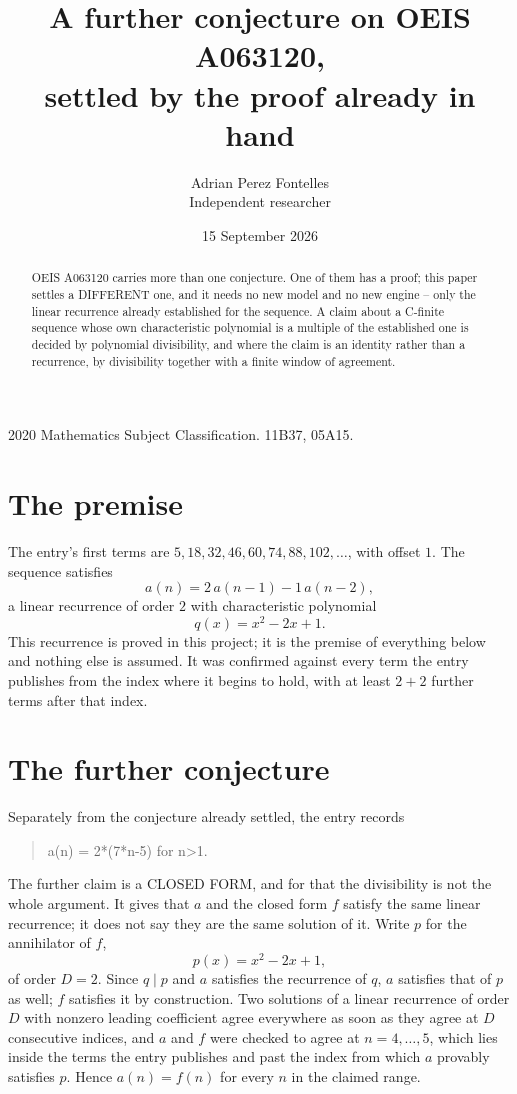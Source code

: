 \documentclass[11pt,a4paper]{article}
\title{A further conjecture on OEIS A063120,\\ \large settled by the proof already in hand}
\author{Adrian Perez Fontelles\\ \small Independent researcher}
\date{15 September 2026}
\theoremstyle{plain}
\theoremstyle{definition}
\begin{document}
\maketitle

\begin{abstract}
OEIS A063120 carries more than one conjecture. One of them has a proof; this paper settles a
DIFFERENT one, and it needs no new model and no new engine -- only the linear recurrence already
established for the sequence. A claim about a C-finite sequence whose own characteristic
polynomial is a multiple of the established one is decided by polynomial divisibility, and where
the claim is an identity rather than a recurrence, by divisibility together with a finite window
of agreement.
\end{abstract}

\noindent\small 2020 Mathematics Subject Classification. 11B37, 05A15.\normalsize

\section{The premise}

The entry's first terms are $5, 18, 32, 46, 60, 74, 88, 102,\dots$, with offset $1$. The sequence satisfies
\[
  a(n)=2\,a(n-1) - 1\,a(n-2) ,
\]
a linear recurrence of order $2$ with characteristic polynomial
\[
  q(x)=x^{2} - 2 x + 1 .
\]
This recurrence is proved in this project; it is the premise of everything below and nothing else is assumed.
It was confirmed against every term the entry publishes from the index where it begins to hold,
with at least $2+2$ further terms after that index.

\section{The further conjecture}

Separately from the conjecture already settled, the entry records

\begin{quote}\raggedright a(n) = 2*(7*n-5) for n>1.\end{quote}

The further claim is a CLOSED FORM, and for that the divisibility is not the whole argument. It
gives that $a$ and the closed form $f$ satisfy the same linear recurrence; it does not say they
are the same solution of it. Write $p$ for the annihilator of $f$,
\[
  p(x)=x^{2} - 2 x + 1 ,
\]
of order $D=2$. Since $q\mid p$ and $a$ satisfies the recurrence of $q$, $a$ satisfies that of
$p$ as well; $f$ satisfies it by construction. Two solutions of a linear recurrence of order $D$
with nonzero leading coefficient agree everywhere as soon as they agree at $D$ consecutive
indices, and $a$ and $f$ were checked to agree at $n=4,\dots,5$,
which lies inside the terms the entry publishes and past the index from which $a$ provably
satisfies $p$. Hence $a(n)=f(n)$ for every $n$ in the claimed range.
\end{document}
